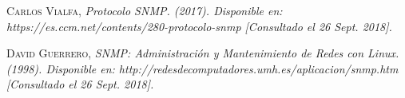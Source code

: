 \begin{thebibliography}{}
 \textsc{Carlos Vialfa},
\textit{Protocolo SNMP. (2017). Disponible en: https://es.ccm.net/contents/280-protocolo-snmp [Consultado el 26 Sept. 2018].}

 \textsc{David Guerrero},
\textit{SNMP: Administración y Mantenimiento de Redes con Linux. (1998). Disponible en: http://redesdecomputadores.umh.es/aplicacion/snmp.htm [Consultado el 26 Sept. 2018].}

\end{thebibliography}